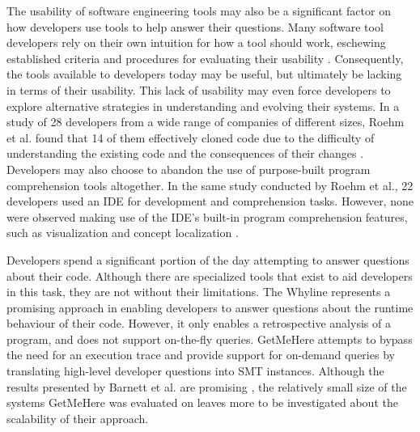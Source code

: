 \par The usability of software engineering tools may also be a significant
factor on how developers use tools to help answer their questions.
Many software tool developers rely on their own intuition for how a tool should
work, eschewing established criteria and procedures for evaluating their 
usability \cite{toleman-98-soft-tools}.
Consequently, the tools available to developers today may be useful, but
ultimately be lacking in terms of their usability.
This lack of usability may even force developers to explore alternative
strategies in understanding and evolving their systems.
In a study of 28 developers from a wide range of companies of different sizes,
Roehm et al. found that 14 of them effectively cloned code due to the
difficulty of understanding the existing code and the consequences of their
changes \cite{roehm-2012-comprehend-software}.
Developers may also choose to abandon the use of purpose-built program
comprehension tools altogether.
In the same study conducted by Roehm et al., 22 developers used an IDE
for development and comprehension tasks.
However, none were observed making use of the IDE's built-in program 
comprehension features, such as visualization and concept localization
\cite{roehm-2012-comprehend-software}.

\par Developers spend a significant portion of the day attempting to answer
questions about their code.
Although there are specialized tools that exist to aid developers in this task,
they are not without their limitations. 
The Whyline represents a promising approach in enabling developers to answer 
questions about the runtime behaviour of their code.
However, it only enables a retrospective analysis of a program, and does not 
support on-the-fly queries.
GetMeHere attempts to bypass the need for an execution trace and provide support
for on-demand queries by translating high-level developer questions into SMT
instances. 
Although the results presented by Barnett et al. are promising
\cite{barnett-2014-get}, the relatively small size of the systems GetMeHere was 
evaluated on leaves more to be investigated about the scalability of their 
approach.

\endinput

TODO: add a paragraph about what my thesis attempts to contribute (in relation
to the related work section).

